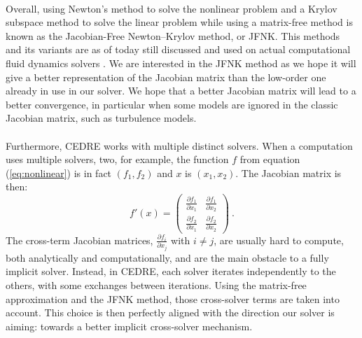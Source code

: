       \paragraph{}
      Overall, using Newton's method to solve the nonlinear problem and a Krylov subspace method to solve the linear problem while using a matrix-free method is known as the Jacobian-Free Newton--Krylov method, or JFNK.
      This methods and its variants are as of today still discussed \cite{AnWenFeng2011, Turpault2003} and used on actual computational fluid dynamics solvers \cite{LiuZhangZhongEtAl2015, FrancoCamierAndrejEtAl2020}.
      We are interested in the JFNK method as we hope it will give a better representation of the Jacobian matrix than the low-order one already in use in our solver.
      We hope that a better Jacobian matrix will lead to a better convergence, in particular when some models are ignored in the classic Jacobian matrix, such as turbulence models.

      \paragraph{}
      Furthermore, CEDRE works with multiple distinct solvers.
      When a computation uses multiple solvers, two, for example, the function $f$ from equation (\ref{eq:nonlinear}) is in fact $\left(f_1, f_2\right)$ and $x$ is $\left(x_1, x_2\right)$.
      The Jacobian matrix is then:
      \begingroup
      \renewcommand*{\arraystretch}{1.5}
      \begin{equation}
        f'\left(x\right) = \begin{pmatrix} \frac{\partial f_1}{\partial x_1} & \frac{\partial f_1}{\partial x_2} \\ \frac{\partial f_2}{\partial x_1} & \frac{\partial f_2}{\partial x_2} \end{pmatrix}\ .
      \end{equation}
      \endgroup
      The cross-term Jacobian matrices, $\frac{\partial f_i}{\partial x_j}$ with $i \ne j$, are usually hard to compute, both analytically and computationally, and are the main obstacle to a fully implicit solver.
      Instead, in CEDRE, each solver iterates independently to the others, with some exchanges between iterations.
      Using the matrix-free approximation and the JFNK method, those cross-solver terms are taken into account.
      This choice is then perfectly aligned with the direction our solver is aiming: towards a better implicit cross-solver mechanism.

